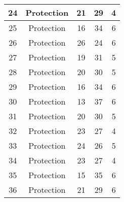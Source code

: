 \documentclass[results.tex]{subfiles}
\begin{document}
\begin{center}
\begin{tabular}{| c || c | c | c | c |}
            \hline
            24                      & Protection                   & 21                     & 29                      & 4                    \\
            \hline
            25                      & Protection                   & 16                     & 34                      & 6                    \\
            \hline
            26                      & Protection                   & 26                     & 24                      & 6                    \\
            \hline
            27                      & Protection                   & 19                     & 31                      & 5                    \\
            \hline
            28                      & Protection                   & 20                     & 30                      & 5                    \\
            \hline
            29                      & Protection                   & 16                     & 34                      & 6                    \\
            \hline
            30                      & Protection                   & 13                     & 37                      & 6                    \\
            \hline
            31                      & Protection                   & 20                     & 30                      & 5                    \\
            \hline
            32                      & Protection                   & 23                     & 27                      & 4                    \\
            \hline
            33                      & Protection                   & 24                     & 26                      & 5                    \\
            \hline
            34                      & Protection                   & 23                     & 27                      & 4                    \\
            \hline
            35                      & Protection                   & 15                     & 35                      & 6                    \\
            \hline
            36                      & Protection                   & 21                     & 29                      & 6                    \\

\end{tabular}
\end{center}
\end{document}
